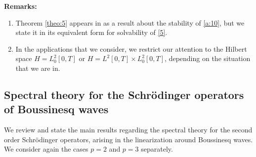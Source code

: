 \documentclass[final,11pt,leqno]{amsart}
\begin{document}
 {\bf Remarks:}
 \begin{enumerate}
 \item Theorem \ref{theo:5} appears in \cite{SS1} as a result about the stability of
 \eqref{a:10}, but we state it in its equivalent form for solvability of
 \eqref{5}.
 \item In the applications that we consider, we restrict our attention to the Hilbert space $H=L^2_0[0,T]$ or $H=L^2[0,T]\times L^2_0[0,T]$,
 depending on the situation that we are in.
 \end{enumerate}

\subsection{Spectral theory for the Schr\"odinger operators   of   Boussinesq waves}
We   review and state the main results regarding the spectral theory for  the second order Schr\"odinger operators, arising in the
linearization around Boussinesq waves. We consider again the cases $p=2$ and $p=3$ separately.
\end{document}
